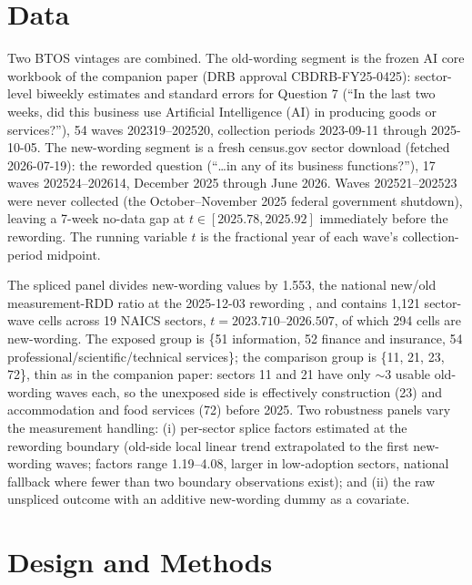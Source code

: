 \documentclass[11pt]{article}
\begin{document}
\section{Data}\label{sec:data}

Two BTOS vintages are combined. The old-wording segment is the frozen AI core
workbook of the companion paper (DRB approval CBDRB-FY25-0425): sector-level
biweekly estimates and standard errors for Question 7 (``In the last two
weeks, did this business use Artificial Intelligence (AI) in producing goods
or services?''), 54 waves 202319--202520, collection periods 2023-09-11
through 2025-10-05. The new-wording segment is a fresh census.gov sector
download (fetched 2026-07-19): the reworded question (``\ldots in any of its
business functions?''), 17 waves 202524--202614, December 2025 through June
2026. Waves 202521--202523 were never collected (the October--November 2025
federal government shutdown), leaving a 7-week no-data gap at
$t \in [2025.78, 2025.92]$ immediately before the rewording. The running
variable $t$ is the fractional year of each wave's collection-period
midpoint.

The spliced panel divides new-wording values by 1.553, the national
new/old measurement-RDD ratio at the 2025-12-03 rewording
\cite{hillebrandt2026rewording}, and contains 1{,}121 sector-wave cells across
19 NAICS sectors, $t = 2023.710$--$2026.507$, of which 294 cells are
new-wording. The exposed group is \{51 information, 52 finance and insurance,
54 professional/scientific/technical services\}; the comparison group is
\{11, 21, 23, 72\}, thin as in the companion paper: sectors 11 and 21 have
only $\sim$3 usable old-wording waves each, so the unexposed side is
effectively construction (23) and accommodation and food services (72) before
2025. Two robustness panels vary the measurement handling: (i) per-sector
splice factors estimated at the rewording boundary (old-side local linear
trend extrapolated to the first new-wording waves; factors range 1.19--4.08,
larger in low-adoption sectors, national fallback where fewer than two
boundary observations exist); and (ii) the raw unspliced outcome with an
additive new-wording dummy as a covariate.

\section{Design and Methods}\label{sec:methods}
\end{document}
